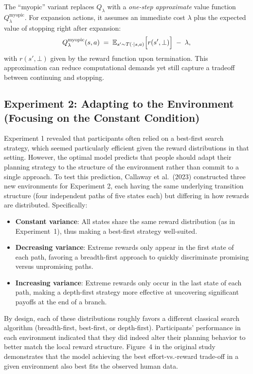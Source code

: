 \documentclass[a4paper,12pt,oneside,article]{memoir}
\begin{document}
The “myopic” variant replaces \(Q_\lambda\) with a
\emph{one-step approximate} value function
\(Q_\lambda^{\mathrm{myopic}}\). For expansion actions,
it assumes an immediate cost \(\lambda\) plus the expected
value of stopping right after expansion:
\[
Q_\lambda^{\mathrm{myopic}}(s,a)
\;=\;
\mathbb{E}_{s'\sim T(\cdot \mid s,a)}
  \Bigl[r(s',\bot)\Bigr] \;-\; \lambda,
\]
with \(r(s',\bot)\) given by the reward function upon
termination. This approximation can reduce computational
demands yet still capture a tradeoff between continuing
and stopping. 
\subsection*{Experiment 2: Adapting to the Environment (Focusing on the Constant Condition)}

Experiment 1 revealed that participants often relied on a best-first search strategy, which seemed particularly efficient given the reward distributions in that setting. However, the optimal model predicts that people should adapt their planning strategy to the structure of the environment rather than commit to a single approach. To test this prediction, Callaway et al.\ (2023) constructed three new environments for Experiment 2, each having the same underlying transition structure (four independent paths of five states each) but differing in how rewards are distributed. Specifically:

\begin{itemize}
    \item \textbf{Constant variance}: All states share the same reward distribution (as in Experiment~1), thus making a best-first strategy well-suited.
    \item \textbf{Decreasing variance}: Extreme rewards only appear in the first state of each path, favoring a breadth-first approach to quickly discriminate promising versus unpromising paths.
    \item \textbf{Increasing variance}: Extreme rewards only occur in the last state of each path, making a depth-first strategy more effective at uncovering significant payoffs at the end of a branch.
\end{itemize}

By design, each of these distributions roughly favors a different classical search algorithm (breadth-first, best-first, or depth-first). Participants’ performance in each environment indicated that they did indeed alter their planning behavior to better match the local reward structure. Figure~4 in the original study demonstrates that the model achieving the best effort-vs.-reward trade-off in a given environment also best fits the observed human data.
\end{document}

